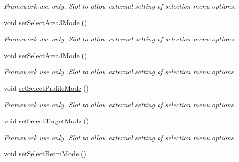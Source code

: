 \begin{DoxyCompactItemize}
\begin{DoxyCompactList}\small\item\em Framework use only. Slot to allow external setting of selection menu options. \end{DoxyCompactList}\item 
\hypertarget{classQEImage_af681dc639328a0fab8274385c842c5bd}{
void \hyperlink{classQEImage_af681dc639328a0fab8274385c842c5bd}{setSelectArea3Mode} ()}
\label{classQEImage_af681dc639328a0fab8274385c842c5bd}

\begin{DoxyCompactList}\small\item\em Framework use only. Slot to allow external setting of selection menu options. \end{DoxyCompactList}\item 
\hypertarget{classQEImage_acb553dbe97807cbc392102b615b50d8c}{
void \hyperlink{classQEImage_acb553dbe97807cbc392102b615b50d8c}{setSelectArea4Mode} ()}
\label{classQEImage_acb553dbe97807cbc392102b615b50d8c}

\begin{DoxyCompactList}\small\item\em Framework use only. Slot to allow external setting of selection menu options. \end{DoxyCompactList}\item 
\hypertarget{classQEImage_ab6f9da4f7b3dc5f140bc2b8cb98d7cf7}{
void \hyperlink{classQEImage_ab6f9da4f7b3dc5f140bc2b8cb98d7cf7}{setSelectProfileMode} ()}
\label{classQEImage_ab6f9da4f7b3dc5f140bc2b8cb98d7cf7}

\begin{DoxyCompactList}\small\item\em Framework use only. Slot to allow external setting of selection menu options. \end{DoxyCompactList}\item 
\hypertarget{classQEImage_a7e499485672cdd0dd110474b994708c2}{
void \hyperlink{classQEImage_a7e499485672cdd0dd110474b994708c2}{setSelectTargetMode} ()}
\label{classQEImage_a7e499485672cdd0dd110474b994708c2}

\begin{DoxyCompactList}\small\item\em Framework use only. Slot to allow external setting of selection menu options. \end{DoxyCompactList}\item 
\hypertarget{classQEImage_abfe93d63d5d009be83bb42c905f42b81}{
void \hyperlink{classQEImage_abfe93d63d5d009be83bb42c905f42b81}{setSelectBeamMode} ()}
\label{classQEImage_abfe93d63d5d009be83bb42c905f42b81}


\end{DoxyCompactItemize}
